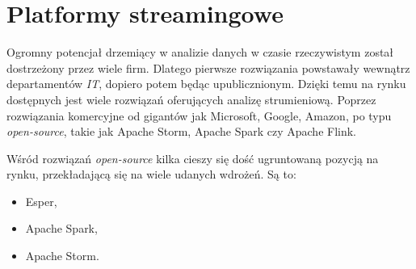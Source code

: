 \section{Platformy streamingowe}
Ogromny potencjał drzemiący w analizie danych w czasie rzeczywistym został dostrzeżony przez wiele firm.
Dlatego pierwsze rozwiązania powstawały wewnątrz departamentów \textit{IT},
dopiero potem będąc upublicznionym.
Dzięki temu na rynku dostępnych jest wiele rozwiązań oferujących analizę strumieniową.
Poprzez rozwiązania komercyjne od gigantów jak Microsoft, Google, Amazon,
po typu \textit{open-source},
takie jak Apache Storm, Apache Spark czy Apache Flink.

Wśród rozwiązań \textit{open-source} kilka cieszy się dość ugruntowaną pozycją na rynku,
przekładającą się na wiele udanych wdrożeń.
Są to:
\begin{itemize}
	\item Esper,
	\item Apache Spark,
	\item Apache Storm.
\end{itemize}






